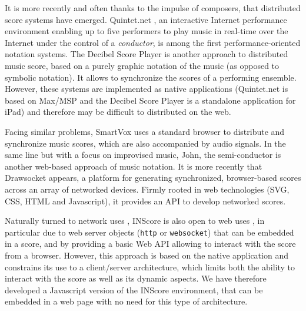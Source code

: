 \documentclass{article}
\begin{document}
It is more recently and often thanks to the impulse of composers, that distributed score systems have emerged.
Quintet.net \cite{doi:10.1162/leon.2005.38.1.23}, an interactive Internet performance environment enabling up to five performers to play music in real-time over the Internet under the control of a \emph{conductor}, is among the first performance-oriented notation systems. 
The Decibel Score Player \cite{Hope_tenor2015} is another approach to distributed music score, based on a purely graphic notation of the music (as opposed to symbolic notation). It allows to synchronize the scores of a performing ensemble.
However, these systems are implemented as native applications (Quintet.net is based on Max/MSP and the Decibel Score Player is a standalone application for iPad) and therefore may be difficult to distributed on the web.

Facing similar problems, SmartVox \cite{bell:hal-01660184} uses a standard browser to distribute and synchronize music scores, which are also accompanied by audio signals. In the same line but with a focus on improvised music, John, the semi-conductor\cite{goudard:hal-01923258} is another web-based approach of music notation.
It is more recently that Drawsocket \cite{Gottfried_tenor2019} appears, a platform for generating synchronized, browser-based scores across an array of networked devices. Firmly rooted in web technologies (SVG, CSS, HTML and Javascript), it provides an API to develop networked scores.

Naturally turned to network uses \cite{Zagorac_tenor2018}, INScore \cite{Fober:12a} is also open to web uses \cite{Fober:15b}, in particular due to web server objects (\texttt{http} or \texttt{websocket}) that can be embedded in a score, and by providing a basic Web API allowing to interact with the score from a browser. 
However, this approach is based on the native application and constrains its use to a client/server architecture, which limits both the ability to interact with the score as well as its dynamic aspects. 
We have therefore developed a Javascript version of the INScore environment, that can be embedded in a web page with no need for this type of architecture. 
\end{document}
